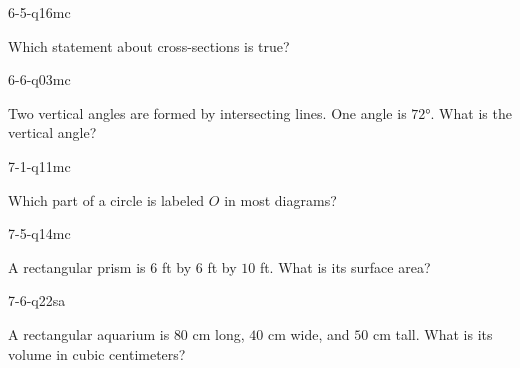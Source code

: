 \begin{practiceQuestion}{6-5-q16}{mc}
\begin{questionText}
Which statement about cross-sections is true?
\end{questionText}
\end{practiceQuestion}

\begin{practiceQuestion}{6-6-q03}{mc}
\begin{questionText}
Two vertical angles are formed by intersecting lines. One angle is $72°$. What is the vertical angle?
\end{questionText}
\end{practiceQuestion}

\begin{practiceQuestion}{7-1-q11}{mc}
\begin{questionText}
Which part of a circle is labeled $O$ in most diagrams?
\end{questionText}
\end{practiceQuestion}

\begin{practiceQuestion}{7-5-q14}{mc}
\begin{questionText}
A rectangular prism is $6$ ft by $6$ ft by $10$ ft. What is its surface area?
\end{questionText}
\end{practiceQuestion}

\begin{practiceQuestion}{7-6-q22}{sa}
\begin{questionText}
A rectangular aquarium is $80$ cm long, $40$ cm wide, and $50$ cm tall. What is its volume in cubic centimeters?
\end{questionText}
\end{practiceQuestion}

